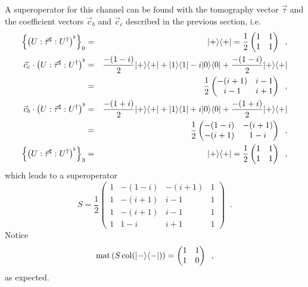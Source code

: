 A superoperator for this channel can be found with the tomography vector $\vec{\tau}$ and the coefficient vectors $\vec{c}_b$ and $\vec{c}_c$ described in the previous section, i.e.\
\begin{eqnarray*}
\left\{\left(U:\vec{\tau}^\sharp:U^\dagger\right)^\flat\right\}_0 &=& |+\rangle\langle+|=\frac{1}{2}\begin{pmatrix}
1&1\\
1&1
\end{pmatrix}\;\;,\\
\vec{c}_c\cdot\left(U:\vec{\tau}^\sharp:U^\dagger\right)^\flat &=& \frac{-(1-i)}{2}|+\rangle\langle+|+|1\rangle\langle1|-i|0\rangle\langle0|+\frac{-(1-i)}{2}|+\rangle\langle+|\\
&=&\frac{1}{2}\begin{pmatrix}
-(i+1)&i-1\\
i-1&i+1
\end{pmatrix}\;\;,\\
\vec{c}_b\cdot\left(U:\vec{\tau}^\sharp:U^\dagger\right)^\flat &=& \frac{-(1+i)}{2}|+\rangle\langle+|+|1\rangle\langle1|+i|0\rangle\langle0|+\frac{-(1+i)}{2}|+\rangle\langle+|\\
&=&\frac{1}{2}\begin{pmatrix}
-(1-i)&-(i+1)\\
-(i+1)&1-i
\end{pmatrix}\;\;,\\
\left\{\left(U:\vec{\tau}^\sharp:U^\dagger\right)^\flat\right\}_3 &=& |+\rangle\langle+|=\frac{1}{2}\begin{pmatrix}
1&1\\
1&1
\end{pmatrix}\;\;,\\
\end{eqnarray*}
which leads to a superoperator
$$
S = \frac{1}{2}\begin{pmatrix}
1&-(1-i)&-(i+1)&1\\
1&-(i+1)&i-1&1\\
1&-(i+1)&i-1&1\\
1&1-i&i+1&1
\end{pmatrix}\;\;.
$$
Notice
$$
\operatorname{mat}\left(S\operatorname{col}(|-\rangle\langle-|)\right) =\begin{pmatrix}
1&1\\
1&0
\end{pmatrix}\;\;,
$$
as expected.

